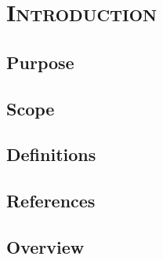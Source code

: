\documentclass[ProjectRequirements.tex]{subfiles}
\begin{document}
\bigskip

\section{\textsc{\Large Introduction}}
	\subsection{Purpose}
	\subsection{Scope}
	\subsection{Definitions}
	\subsection{References}
	\subsection{Overview}
\end{document}
